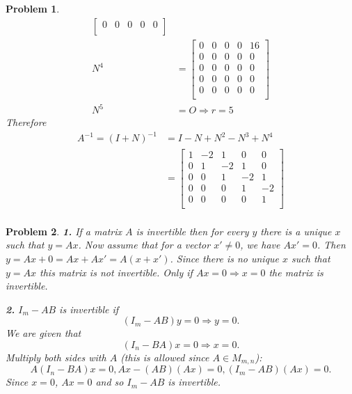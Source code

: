 \documentclass{article}
\newcommand{\subno}[1]{\par\noindent\textbf{#1}}
\theoremstyle{pprop}
\newtheorem{problem}{Problem}[section]
\begin{document}
\begin{problem}
\begin{align*}
\begin{bmatrix}
0 & 0 & 0 & 0 & 0 \\
\end{bmatrix} \\
N^4&=
\begin{bmatrix}
0 & 0 & 0 & 0 & 16 \\
0 & 0 & 0 & 0 & 0 \\
0 & 0 & 0 & 0 & 0 \\
0 & 0 & 0 & 0 & 0 \\
0 & 0 & 0 & 0 & 0 \\
\end{bmatrix} \\
N^5&=O \Rightarrow r=5
\end{align*}
Therefore
\begin{align*}
A^{-1}=(I+N)^{-1}&=I-N+N^2-N^3+N^4\\
&=
\begin{bmatrix}
1 & -2 & 1 & 0 & 0 \\
0 & 1 & -2 & 1 & 0 \\
0 & 0 & 1 & -2 & 1 \\
0 & 0 & 0 & 1 & -2\\
0 & 0 & 0 & 0 & 1 \\
\end{bmatrix} \\
\end{align*}
\end{problem}
\begin{problem}
\subno{1.} If a matrix $A$ is invertible then for every $y$ there is a unique $x$ such that $y=Ax$. Now assume that for a vector 
$x' \neq 0$, we have $Ax'=0$. Then $y=Ax+0=Ax+Ax'=A(x+x')$. Since there is no unique $x$ such that $y=Ax$ this matrix is not 
invertible. Only if $Ax=0 \Rightarrow x=0$ the matrix is invertible.  
\subno{2.} $I_m-AB$ is invertible if 
$$
(I_m - AB)y=0 \Rightarrow y=0.
$$ 
We are given that 
$$
(I_n-BA)x=0 \Rightarrow x=0.
$$
Multiply both sides with $A$ (this is allowed since $A \in M_{m,n}$):
$$
A(I_n-BA)x=0, Ax-(AB)(Ax)=0, (I_m-AB)(Ax)=0.
$$  
Since $x=0$, $Ax=0$ and so $I_m-AB$ is invertible.
\end{problem}
\end{document}
